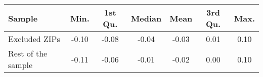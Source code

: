 \begin{tabular}{lcccccc}
  \hline
Sample & Min. & 1st Qu. & Median & Mean & 3rd Qu. & Max. \\ 
  \hline
Excluded ZIPs & -0.10 & -0.08 & -0.04 & -0.03 & 0.01 & 0.10 \\ 
  Rest of the sample & -0.11 & -0.06 & -0.01 & -0.02 & 0.00 & 0.10 \\ 
   \hline
\end{tabular}

